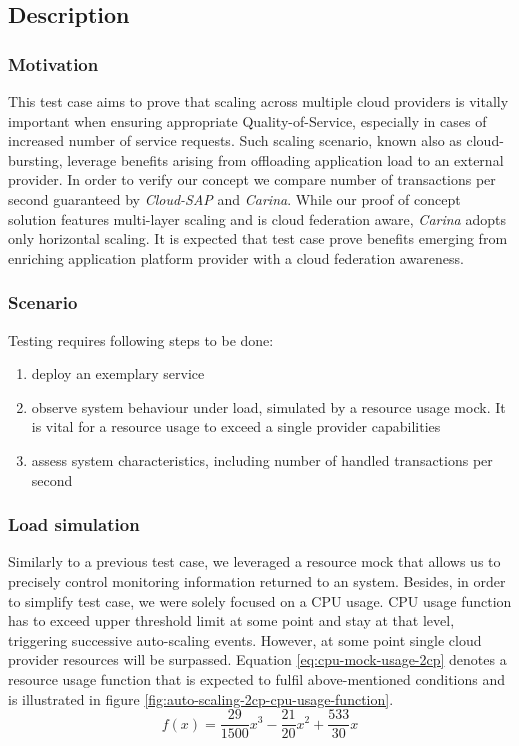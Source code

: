 \subsection*{Description}

\subsubsection{Motivation} This test case aims to prove that scaling across multiple cloud providers is vitally important when ensuring appropriate Quality-of-Service, especially in cases of increased number of service requests. Such scaling scenario, known also as cloud-bursting, leverage benefits arising from offloading application load to an external provider. In order to verify our concept we compare number of transactions per second guaranteed by \emph{Cloud-SAP} and \emph{Carina}. While our proof of concept solution features multi-layer scaling and is cloud federation aware, \emph{Carina} adopts only horizontal scaling. It is expected that test case prove benefits emerging from enriching application platform provider with a cloud federation awareness.
 
\subsubsection{Scenario}
Testing requires following steps to be done:
\begin{enumerate}
\item deploy an exemplary service
\item observe system behaviour under load, simulated by a resource usage mock. It is vital for a resource usage to exceed a single provider capabilities
\item assess system characteristics, including number of handled transactions per second
\end{enumerate}

\subsubsection*{Load simulation}
Similarly to a previous test case, we leveraged a resource mock that allows us to precisely control monitoring information returned to an system. Besides, in order to simplify test case, we were solely focused on a CPU usage. CPU usage function has to exceed upper threshold limit at some point and stay at that level, triggering successive auto-scaling events. However, at some point single cloud provider resources will be surpassed. Equation \eqref{eq:cpu-mock-usage-2cp} denotes a resource usage function that is expected to fulfil above-mentioned conditions and is illustrated in figure \ref{fig:auto-scaling-2cp-cpu-usage-function}.
\begin{equation}
 f(x) = \frac{29}{1500}x^3-\frac{21}{20}x^2+\frac{533}{30}x
 \label{eq:cpu-mock-usage-2cp}
\end{equation}

